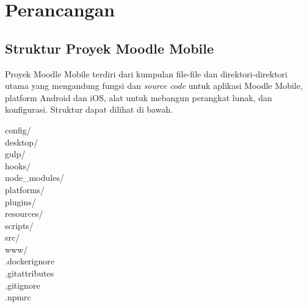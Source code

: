 \chapter{Perancangan}
\label{perancangan} 

\section{Struktur Proyek Moodle Mobile}
\label{struktur proyek}

Proyek Moodle Mobile terdiri dari kumpulan file-file dan direktori-direktori utama yang mengandung fungsi dan \textit{source code} untuk aplikasi Moodle Mobile, platform Android dan iOS, alat untuk mebangun perangkat lunak, dan konfigurasi. Struktur dapat dilihat di bawah.


\begin{center}
\begin{minipage}{.6\textwidth}
config/                      \\                                         
desktop/                      \\                                        
gulp/                                                                 \\
hooks/                                     \\                           
node\_modules/                      \\                                   
platforms/                               \\                             
plugins/                                     \\                         
resources/                               \\                             
scripts/                                       \\                       
src/                                                 \\                 
www/                                             \\                    
.dockerignore                                      \\                  
.gitattributes                                  \\                     
.gitignore                                           \\                
.npmrc                                               \\                

\end{minipage}
\end{center}
